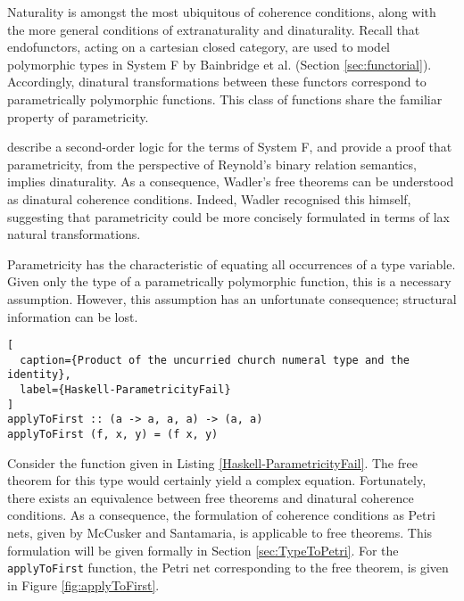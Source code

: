 \documentclass[../Dissertation.tex]{subfiles}
\begin{document}
\par
Naturality is amongst the most ubiquitous of coherence conditions, along with the more general conditions of extranaturality and dinaturality. Recall that endofunctors, acting on a cartesian closed category, are used to model polymorphic types in System F by Bainbridge et al. (Section \ref{sec:functorial}). Accordingly, dinatural transformations between these functors correspond to parametrically polymorphic functions. This class of functions share the familiar property of parametricity.
\par
{} describe a second-order logic for the terms of System F, and provide a proof that parametricity, from the perspective of Reynold's binary relation semantics, implies dinaturality. As a consequence, Wadler's free theorems can be understood as dinatural coherence conditions. Indeed, Wadler recognised this himself, suggesting that parametricity could be more concisely formulated in terms of lax natural transformations.
\par
Parametricity has the characteristic of equating all occurrences of a type variable. Given only the type of a parametrically polymorphic function, this is a necessary assumption. However, this assumption has an unfortunate consequence; structural information can be lost.
\begin{lstlisting}[
  caption={Product of the uncurried church numeral type and the identity},
  label={Haskell-ParametricityFail}
]
applyToFirst :: (a -> a, a, a) -> (a, a)
applyToFirst (f, x, y) = (f x, y)
\end{lstlisting}
Consider the function given in Listing \ref{Haskell-ParametricityFail}. The free theorem for this type would certainly yield a complex equation. Fortunately, there exists an equivalence between free theorems and dinatural coherence conditions. As a consequence, the formulation of coherence conditions as Petri nets, given by McCusker and Santamaria, is applicable to free theorems. This formulation will be given  formally in Section \ref{sec:TypeToPetri}. For the \lstinline{applyToFirst} function, the Petri net corresponding to the free theorem, is given in Figure \ref{fig:applyToFirst}.
\end{document}
